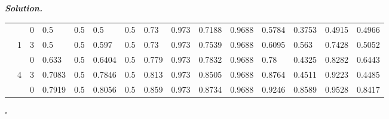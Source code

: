 \documentclass[10pt]{article}
\newenvironment{solution}[1][\it{Solution}]{\textbf{#1. } }{$\square$}
\begin{document}
\begin{solution}
\begin{table}[H]
\begin{tabular}{|l|l|l|l|l|l|l|l|l|l|l|l|l|l|l|}
\rowcolor[HTML]{C0C0C0} 
\cellcolor[HTML]{32CB00}                        & \cellcolor[HTML]{FE0000}                     & \cellcolor[HTML]{FFCE93}0                    & 0.5                            & 0.5                            & 0.5                            & 0.5                            & \cellcolor[HTML]{EFEFEF}0.73   & \cellcolor[HTML]{EFEFEF}0.973  & \cellcolor[HTML]{EFEFEF}0.7188 & \cellcolor[HTML]{EFEFEF}0.9688 & 0.5784                         & 0.3753                         & 0.4915                         & 0.4966                         \\ \cline{3-15} 
\rowcolor[HTML]{EFEFEF} 
\cellcolor[HTML]{32CB00}                        & \multirow{-2}{*}{\cellcolor[HTML]{FE0000}1}  & \cellcolor[HTML]{F8A102}3                    & 0.5                            & 0.5                            & 0.597                          & 0.5                            & \cellcolor[HTML]{C0C0C0}0.73   & \cellcolor[HTML]{C0C0C0}0.973  & \cellcolor[HTML]{C0C0C0}0.7539 & \cellcolor[HTML]{C0C0C0}0.9688 & 0.6095                         & 0.563                          & 0.7428                         & 0.5052                         \\ \cline{2-15} 
\rowcolor[HTML]{C0C0C0} 
\cellcolor[HTML]{32CB00}                        & \cellcolor[HTML]{FD6864}                     & \cellcolor[HTML]{FFCE93}0                    & 0.633                          & 0.5                            & 0.6404                         & 0.5                            & \cellcolor[HTML]{EFEFEF}0.779  & \cellcolor[HTML]{EFEFEF}0.973  & \cellcolor[HTML]{EFEFEF}0.7832 & \cellcolor[HTML]{EFEFEF}0.9688 & 0.78                           & 0.4325                         & 0.8282                         & 0.6443                         \\ \cline{3-15} 
\rowcolor[HTML]{EFEFEF} 
\cellcolor[HTML]{32CB00}                        & \multirow{-2}{*}{\cellcolor[HTML]{FD6864}4}  & \cellcolor[HTML]{F8A102}3                    & 0.7083                         & 0.5                            & 0.7846                         & 0.5                            & \cellcolor[HTML]{C0C0C0}0.813  & \cellcolor[HTML]{C0C0C0}0.973  & \cellcolor[HTML]{C0C0C0}0.8505 & \cellcolor[HTML]{C0C0C0}0.9688 & 0.8764                         & 0.4511                         & 0.9223                         & 0.4485                         \\ \cline{2-15} 
\rowcolor[HTML]{C0C0C0} 
\cellcolor[HTML]{32CB00}                        & \cellcolor[HTML]{FFCCC9}                     & \cellcolor[HTML]{FFCE93}0                    & 0.7919                         & 0.5                            & 0.8056                         & 0.5                            & \cellcolor[HTML]{EFEFEF}0.859  & \cellcolor[HTML]{EFEFEF}0.973  & \cellcolor[HTML]{EFEFEF}0.8734 & \cellcolor[HTML]{EFEFEF}0.9688 & 0.9246                         & 0.8589                         & 0.9528                         & 0.8417                         \\ \cline{3-15} 

\end{tabular}
\end{table}
\end{solution}
\end{document}
